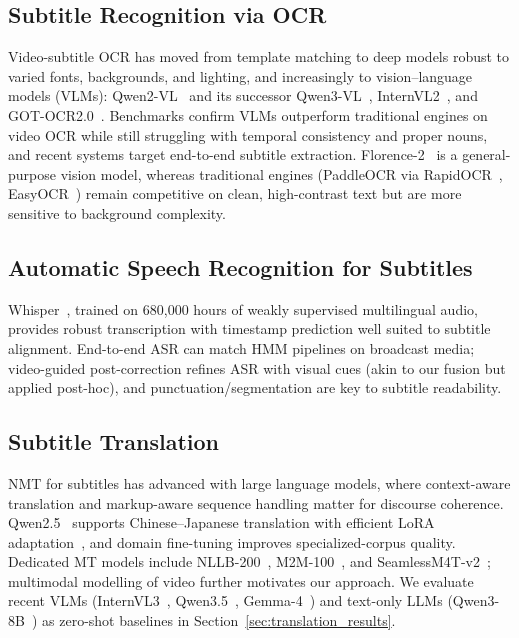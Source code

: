 \documentclass[journal]{IEEEtran}
\begin{document}
\subsection{Subtitle Recognition via OCR}
Video-subtitle OCR has moved from template matching to deep models robust to varied fonts, backgrounds, and lighting, and increasingly to vision--language models (VLMs): Qwen2-VL~\cite{wang2024qwen2} and its successor Qwen3-VL~\cite{qwen3vl2025}, InternVL2~\cite{chen2024internvl}, and GOT-OCR2.0~\cite{wang2024gotocr}.
Benchmarks confirm VLMs outperform traditional engines on video OCR while still struggling with temporal consistency and proper nouns, and recent systems target end-to-end subtitle extraction.
Florence-2~\cite{florence2_2024} is a general-purpose vision model, whereas traditional engines (PaddleOCR via RapidOCR~\cite{rapidocr2022}, EasyOCR~\cite{easyocr2020}) remain competitive on clean, high-contrast text but are more sensitive to background complexity.

\subsection{Automatic Speech Recognition for Subtitles}
Whisper~\cite{radford2023robust}, trained on 680{,}000 hours of weakly supervised multilingual audio, provides robust transcription with timestamp prediction well suited to subtitle alignment.
End-to-end ASR can match HMM pipelines on broadcast media; video-guided post-correction refines ASR with visual cues (akin to our fusion but applied post-hoc), and punctuation/segmentation are key to subtitle readability.

\subsection{Subtitle Translation}
NMT for subtitles has advanced with large language models, where context-aware translation and markup-aware sequence handling matter for discourse coherence.
Qwen2.5~\cite{yang2024qwen2} supports Chinese--Japanese translation with efficient LoRA adaptation~\cite{hu2022lora}, and domain fine-tuning improves specialized-corpus quality.
Dedicated MT models include NLLB-200~\cite{nllb2022}, M2M-100~\cite{fan2021beyond}, and SeamlessM4T-v2~\cite{seamless2023}; multimodal modelling of video further motivates our approach.
We evaluate recent VLMs (InternVL3~\cite{chen2024internvl}, Qwen3.5~\cite{qwen35_2025}, Gemma-4~\cite{gemma2025}) and text-only LLMs (Qwen3-8B~\cite{qwen3_2025}) as zero-shot baselines in Section~\ref{sec:translation_results}.
\end{document}
